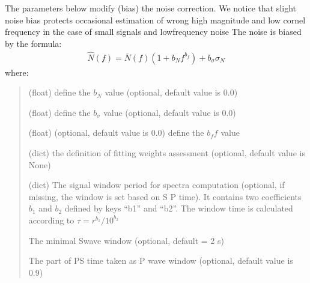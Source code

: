 \documentclass[letterpaper,10pt,english]{sphinxmanual}
\begin{document}
\sphinxAtStartPar
The parameters below modify (bias) the noise correction. We notice that slight noise bias
protects occasional estimation of wrong high magnitude and low cornel frequency in the
case of small signals and low\sphinxhyphen{}frequency noise
The noise is biased by the formula:
\begin{equation*}
\begin{split}\widehat{N} \left( f \right) =
\overline{N} \left( f \right)\left( 1+b_Nf^{b_f} \right) + b_{\sigma}\sigma_N\end{split}
\end{equation*}
\sphinxAtStartPar
where:
\begin{quote}\begin{description}
\sphinxAtStartPar
(float) define the \(b_N\) value (optional, default value is 0.0)

\sphinxAtStartPar
(float) define the \(b_{\sigma}\) value (optional, default value is 0.0)

\sphinxAtStartPar
(float) (optional, default value is 0.0) define the \(b_ff\) value

\sphinxAtStartPar
(dict) the definition of fitting weights assessment (optional, default value is None)

\sphinxAtStartPar
(dict) The signal window period for spectra computation
(optional, if missing, the window is set based on S \sphinxhyphen{} P time).
It contains two coefficients \(b_1\) and \(b_2\) defined by keys “b1” and “b2”.
The window time is calculated according to \(\tau = r^{b_1} / 10^{b_2}\)

\sphinxAtStartPar
The minimal S\sphinxhyphen{}wave window (optional, default  = 2 s)

\sphinxAtStartPar
The part of P\sphinxhyphen{}S time taken as P wave window (optional, default value is 0.9)

\end{description}\end{quote}
\end{document}
